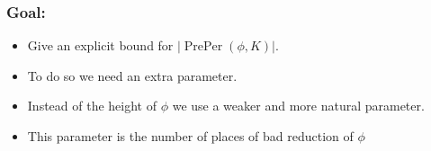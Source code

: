 \documentclass{beamer}
\def\PP{{\mathbb P}}
\DeclareMathOperator{\PrePer}{PrePer}
\theoremstyle{thmstyle}
\newtheorem*{mythm}{Theorem}
\theoremstyle{mystyle}
\newtheorem*{conjecture}{Conjecture}
\theoremstyle{qstnstyle}
\begin{document}
%
%
%
%


\begin{frame}
\frametitle{Goal:}

\begin{itemize}


\item Give an explicit bound for $|\PrePer(\phi,K)|$.

\vspace{10mm} 

\item To do so we need an extra parameter. 

\vspace{10mm} 

\item Instead of the height of $\phi$ we use a weaker and more natural parameter.
\vspace{10mm} 



\item This parameter is the number of places of bad reduction of $\phi$

\end{itemize}


\end{frame}
\end{document}
